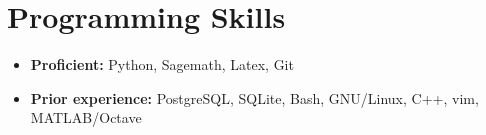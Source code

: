 \documentclass[letterpaper,10pt]{article}
\newcommand{\resumeSubHeadingListStart}{\begin{itemize}[leftmargin=*]}
\newcommand{\resumeSubHeadingListEnd}{\end{itemize}}
\begin{document}
\section{Programming Skills}
  \resumeSubHeadingListStart
    \item{
            \textbf{Proficient: }{Python, Sagemath, Latex, Git}
    }
\item{\vspace{-0.15cm}
            \textbf{Prior experience: }{PostgreSQL, SQLite, Bash, GNU/Linux,
            C++, vim, MATLAB/Octave}
    }
  \resumeSubHeadingListEnd


\end{document}
